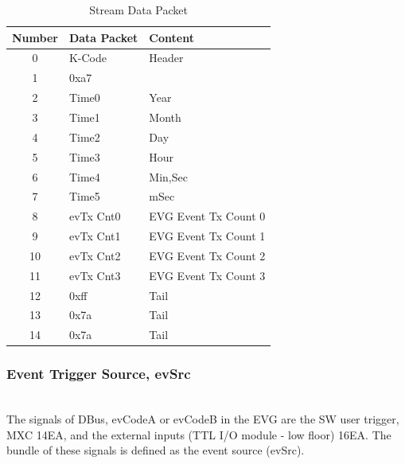\documentclass[journal,reqno]{IEEEtran}
\begin{document}
\begin{table}[h!t]
	\centering
	\caption{Stream Data Packet}
	\label{stream_data_packet}
	
	\begin{tabular}{@{}cll@{}}
		
		\hline
		\textbf{Number}	& \textbf{Data Packet}			& \textbf{Content}\\
		\hline
		0				& K-Code						& Header\\
		1				& 0xa7			                &\\
		\hline
		2				& Time0							& Year\\
		3				& Time1                         & Month\\
		4				& Time2                         & Day\\
		5				& Time3                         & Hour\\
		6				& Time4                         & Min,Sec\\
		7				& Time5                         & mSec\\								
		\hline
		8				& evTx Cnt0						& EVG Event Tx Count 0\\        
		9				& evTx Cnt1						& EVG Event Tx Count 1\\        
		10				& evTx Cnt2						& EVG Event Tx Count 2\\        
		11				& evTx Cnt3						& EVG Event Tx Count 3\\        
		12				& 0xff							& Tail\\        
		13				& 0x7a							& Tail\\        								
		14				& 0x7a							& Tail\\        								
		\hline
	\end{tabular}
\end{table}

\subsubsection{Event Trigger Source, evSrc}\hspace*{\fill} \\
The signals of DBus, evCodeA or evCodeB in the EVG are the SW user trigger, MXC 14EA, and the external inputs (TTL I/O module - low floor) 16EA. The bundle of these signals is defined as the event source (evSrc).\newline
\end{document}
